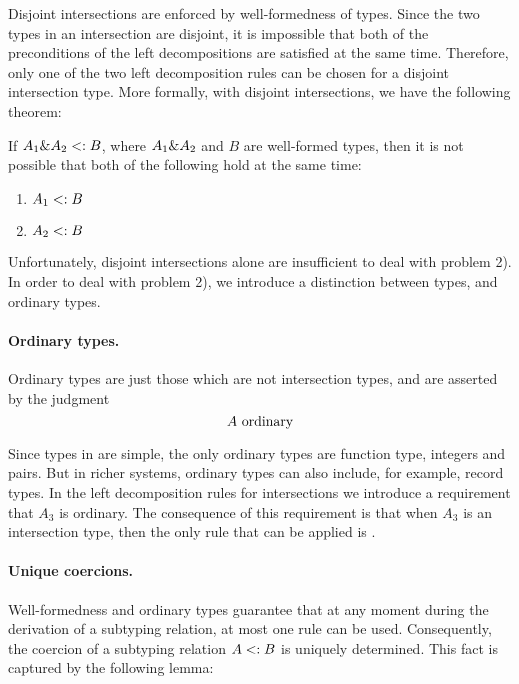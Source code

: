 Disjoint intersections are enforced by well-formedness of types.
Since the two types in an intersection are disjoint, it is impossible
that both of the preconditions of the left decompositions are
satisfied at the same time. Therefore, only one of the two left
decomposition rules can be chosen for a disjoint intersection
type. More formally, with disjoint intersections, we have the
following theorem:

\begin{lemma}
  \label{lemma:unique-subtype-contributor}

  If $A_1 \& A_2 <: B$, where $A_1 \& A_2$ and $B$ are well-formed types,
  then it is not possible that both of the following hold at the same time:
  \begin{enumerate}
    \item $A_1 <: B$
    \item $A_2 <: B$
  \end{enumerate}
\end{lemma}

Unfortunately, disjoint intersections alone are insufficient to deal with
problem 2). In order to deal with problem 2), we introduce a distinction between
types, and ordinary types.

\paragraph{Ordinary types.} Ordinary types are just those which are not intersection
types, and are asserted by the judgment \[ A \ \textnormal{ordinary} \]

\noindent Since types in \name are simple, the only ordinary types are 
function type, integers and pairs.
But in richer systems, ordinary types can also include, for example, record types.
In the left decomposition rules for intersections we introduce a requirement
that $A_3$ is ordinary. The consequence of this requirement is that when $A_3$ is
an intersection type, then the only rule that can be applied is
. 

\paragraph{Unique coercions.}
Well-formedness and ordinary types guarantee that at
any moment during the derivation of a subtyping relation, at most one rule can
be used. Consequently, the coercion of a subtyping relation $A <: B$ is
uniquely determined. This fact is captured by the following lemma:

